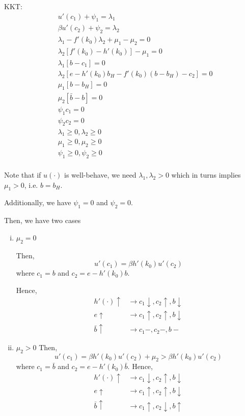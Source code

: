 \documentclass[12pt]{article}
\newcommand{\1}{{\bf 1}} %
\begin{document}
\begin{enumerate}[(1)]
	KKT:
	\begin{align*}
		& u'(c_1) + \psi_1 =\lambda_1 \\
		& \beta u'(c_2)+ \psi_2=\lambda_2 \\
		& \lambda_1 -f'(k_0)\lambda_2 +\mu_1-\mu_2 = 0\\
		&\lambda_2[f'(k_0)-h'(k_0)] -\mu_1 = 0\\
		&\lambda_1 [b-c_1]=0\\
		&\lambda_2 [ e - h'(k_0)b_H-f'(k_0)(b-b_H) -c_2]=0\\
		& \mu_1 [b-b_H]=0\\
		& \mu_2  [\bar{b}-b]=0\\
		& \psi_1c_1=0\\
		& \psi_2c_2=0\\
		&\lambda_1 \geq 0,\lambda_2 \geq 0\\
		& \mu_1 \geq 0,\mu_2  \geq 0\\
		& \psi_1 \geq 0,\psi_2  \geq 0\\
	\end{align*}
	
	Note that if $u(\cdot)$ is well-behave, we need $\lambda_1,\lambda_2>0$ which in turns implies $\mu_1>0$, i.e. $b=b_H$.
	
	Additionally, we have $\psi_1=0$ and $\psi_2=0$.
	
	Then, we have two cases
	\begin{enumerate}[(i)]
		\item $\mu_2=0$
		
		Then,
		\[
		u'(c_1)=\beta h'(k_0)u'(c_2)
		\]
		where $c_1 = b$ and $c_2 =  e - h'(k_0)b$.
		
		Hence,
			\begin{align*}
		h'(\cdot)\uparrow & \to c_1 \downarrow, c_2\uparrow, b\downarrow\\
		e\uparrow & \to c_1 \uparrow, c_2\uparrow, b\downarrow\\
		\bar{b}\uparrow & \to c_1 -, c_2-, b-
		\end{align*}
		\item $\mu_2>0$
				Then,
		\[
		u'(c_1)=\beta h'(k_0)u'(c_2) +\mu_2 > \beta h'(k_0)u'(c_2)
		\]
		where $c_1 = \bar{b}$ and $c_2 =  e - h'(k_0)\bar{b}$.
				Hence,
		\begin{align*}
		h'(\cdot)\uparrow & \to c_1 \downarrow, c_2\uparrow, b\downarrow\\
		e\uparrow & \to c_1 \uparrow, c_2\uparrow, b\downarrow\\
		\bar{b}\uparrow & \to c_1 \uparrow, c_2\downarrow, b\uparrow
		\end{align*}
	\end{enumerate}
	

\end{enumerate}
\end{document}

